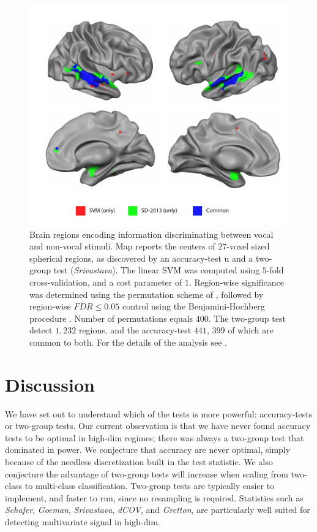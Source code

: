 \documentclass[]{bio}
\begin{document}
\begin{figure}[th]
	\centering
	\includegraphics[width=0.5\columnwidth]{"art/svm_vs_SD"}
	\caption{\footnotesize
		Brain regions encoding information discriminating between vocal and non-vocal stimuli.
		Map reports the centers of $27$-voxel sized spherical regions, as discovered by an accuracy-test u and a two-group test (\emph{Srivastava}). 
		The linear SVM was computed using $5$-fold cross-validation, and a cost parameter of $1$. 
		Region-wise significance was determined using the permutation scheme of \cite{stelzer_statistical_2013}, followed by region-wise $FDR \leq 0.05$ control using the Benjamini-Hochberg procedure \citep{benjamini_controlling_1995}.
		Number of permutations equals $400$.
		The two-group test detect $1,232$ regions, and the accuracy-test $441$, $399$ of which are common to both.
		For the details of the analysis see \cite{gilron_quantifying_2016}.  
	}
	\label{fig:read_data}
\end{figure}








\section{Discussion}
\label{sec:discussion}

We have set out to understand which of the tests is more powerful: accuracy-tests or two-group tests. 
Our current observation is that we have never found accuracy tests to be optimal in high-dim regimes; there was always a two-group test that dominated in power.
We conjecture that accuracy are never optimal, simply because of the needless discretization built in the test statistic.
We also conjecture the advantage of two-group tests will increase when scaling from two-class to multi-class classification.
Two-group tests are typically easier to implement, and faster to run, since no resampling is required. 
Statistics such as \emph{Schafer}, \emph{Goeman}, \emph{Srivastava}, \emph{dCOV}, and \emph{Gretton}, are particularly well suited for detecting multivariate signal in high-dim.
\end{document}
